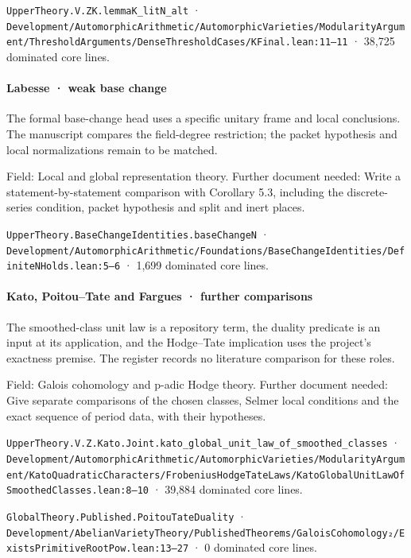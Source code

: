 \nolinkurl{UpperTheory.V.ZK.lemmaK_litN_alt} · \nolinkurl{Development/AutomorphicArithmetic/AutomorphicVarieties/ModularityArgument/ThresholdArguments/DenseThresholdCases/KFinal.lean:11–11} · 38,725 dominated core lines.

\paragraph{Labesse · weak base change}

The formal base-change head uses a specific unitary frame and local conclusions. The manuscript compares the field-degree restriction; the packet hypothesis and local normalizations remain to be matched.

Field: Local and global representation theory. Further document needed: Write a statement-by-statement comparison with Corollary 5.3, including the discrete-series condition, packet hypothesis and split and inert places.

\nolinkurl{UpperTheory.BaseChangeIdentities.baseChangeN} · \nolinkurl{Development/AutomorphicArithmetic/Foundations/BaseChangeIdentities/DefiniteNHolds.lean:5–6} · 1,699 dominated core lines.

\paragraph{Kato, Poitou–Tate and Fargues · further comparisons}

The smoothed-class unit law is a repository term, the duality predicate is an input at its application, and the Hodge–Tate implication uses the project’s exactness premise. The register records no literature comparison for these roles.

Field: Galois cohomology and p-adic Hodge theory. Further document needed: Give separate comparisons of the chosen classes, Selmer local conditions and the exact sequence of period data, with their hypotheses.

\nolinkurl{UpperTheory.V.Z.Kato.Joint.kato_global_unit_law_of_smoothed_classes} · \nolinkurl{Development/AutomorphicArithmetic/AutomorphicVarieties/ModularityArgument/KatoQuadraticCharacters/FrobeniusHodgeTateLaws/KatoGlobalUnitLawOfSmoothedClasses.lean:8–10} · 39,884 dominated core lines.

\nolinkurl{GlobalTheory.Published.PoitouTateDuality} · \nolinkurl{Development/AbelianVarietyTheory/PublishedTheorems/GaloisCohomology₂/ExistsPrimitiveRootPow.lean:13–27} · 0 dominated core lines.

